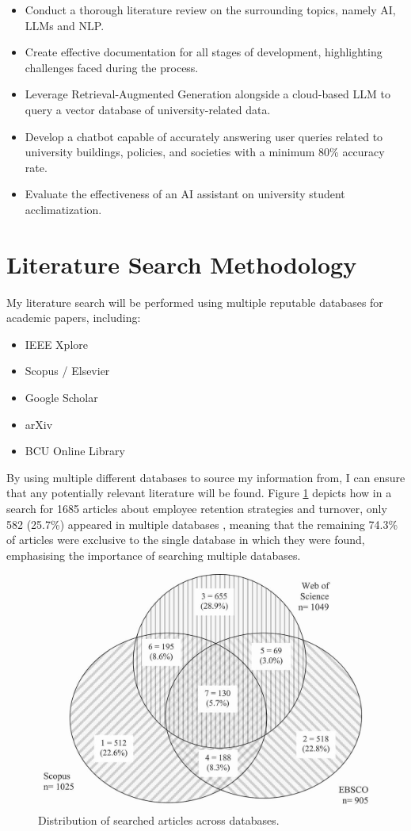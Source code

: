 \documentclass[12pt]{report}
\begin{document}
    \begin{itemize}
        \item Conduct a thorough literature review on the surrounding topics, namely AI, LLMs and NLP.
        \item Create effective documentation for all stages of development, highlighting challenges faced during the process.
        \item Leverage Retrieval-Augmented Generation alongside a cloud-based LLM to query a vector database of university-related data.
        \item Develop a chatbot capable of accurately answering user queries related to university 
        buildings, policies, and societies with a minimum 80\% accuracy rate.
        \item Evaluate the effectiveness of an AI assistant on university student acclimatization.
    \end{itemize}

    \pagebreak %

    \section{Literature Search Methodology}

    \noindent 
    My literature search will be performed using multiple reputable databases for academic papers, including:
    \begin{itemize}
        \item IEEE Xplore
        \item Scopus / Elsevier
        \item Google Scholar
        \item arXiv
        \item BCU Online Library
    \end{itemize}
    
    \noindent By using multiple different databases to source my information from, I can ensure that
    any potentially relevant literature will be found. Figure \ref{fig:litSearch} depicts 
    how in a search for 1685 articles about employee retention strategies and turnover, only 582 (25.7\%) appeared in multiple databases
    \autocite{litSearch}, meaning that the remaining 74.3\% of articles were exclusive to the single 
    database in which they were found, emphasising the importance of searching multiple databases.  

    \begin{figure}[H]
        \centering
        \includegraphics[width=.5\linewidth]{litSearchDBs.jpg}
        \caption{Distribution of searched articles across databases. \autocite{litSearch}}
        \label{fig:litSearch}
    \end{figure}
   
\end{document}

